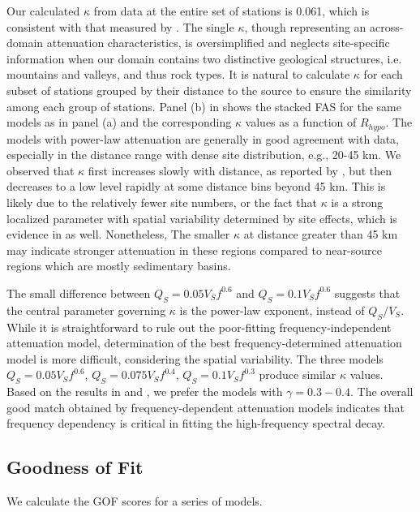 Our calculated $\kappa$ from data at the entire set of stations is 0.061, which is consistent with that measured by \citet{anderson1984model}. The single $\kappa$, though representing an across-domain attenuation characteristics, is oversimplified and neglects site-specific information when our domain contains two distinctive geological structures, i.e. mountains and valleys, and thus rock types. It is natural to calculate $\kappa$ for each subset of stations grouped by their distance to the source to ensure the similarity among each group of stations. Panel (b) in  shows the stacked FAS for the same models as in panel (a) and the corresponding $\kappa$ values as a function of $R_{hypo}$. The models with power-law attenuation are generally in good agreement with data, especially in the distance range with dense site distribution, e.g., 20-45 km. We observed that $\kappa$ first increases slowly with distance, as reported by \citet{anderson1984model}, but then decreases to a low level rapidly at some distance bins beyond 45 km. This is likely due to the relatively fewer site numbers, or the fact that $\kappa$ is a strong localized parameter with spatial variability determined by site effects, which is evidence in \citet{anderson1984model} as well. Nonetheless, The smaller $\kappa$ at distance greater than 45 km may indicate stronger attenuation in these regions compared to near-source regions which are mostly sedimentary basins.

The small difference between $Q_S=0.05V_Sf^{0.6}$ and $Q_S=0.1V_Sf^{0.6}$ suggests that the central parameter governing $\kappa$ is the power-law exponent, instead of $Q_S/V_S$. While it is straightforward to rule out the poor-fitting frequency-independent attenuation model, determination of the best frequency-determined attenuation model is more difficult, considering the spatial variability. The three models $Q_S=0.05V_Sf^{0.6}$, $Q_S=0.075V_Sf^{0.4}$, $Q_S=0.1V_Sf^{0.3}$ produce similar $\kappa$ values. Based on the results in  and , we prefer the models with $\gamma=0.3-0.4$. The overall good match obtained by frequency-dependent attenuation models indicates that frequency dependency is critical in fitting the high-frequency spectral decay.


\subsection{Goodness of Fit}
We calculate the GOF scores for a series of models.

